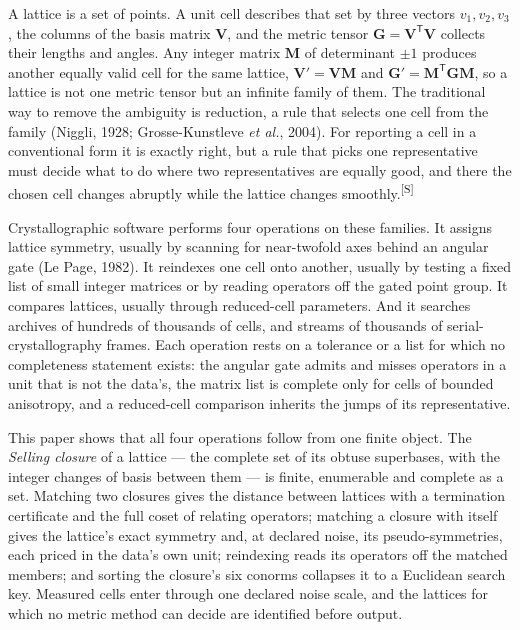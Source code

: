 \documentclass[preprint,pdf]{iucr}          %
\makeatletter
\newcommand{\Gmet}{\mathbf{G}}
\newcommand{\Mop}{\mathbf{M}}
\newcommand{\Bbasis}{\mathbf{V}}
\newcommand{\chk}[1]{\textsuperscript{[S\@nameuse{zn@#1}]}}
\makeatother
\begin{document}
A lattice is a set of points. A unit cell describes that set by three vectors $v_1,v_2,v_3$, the columns of the basis matrix $\Bbasis$, and the metric tensor $\Gmet=\Bbasis^{\mathsf T}\Bbasis$ collects their lengths and angles. Any integer matrix $\Mop$ of determinant $\pm1$ produces another equally valid cell for the same lattice, $\Bbasis'=\Bbasis\Mop$ and $\Gmet'=\Mop^{\mathsf T}\Gmet\Mop$, so a lattice is not one metric tensor but an infinite family of them. The traditional way to remove the ambiguity is reduction, a rule that selects one cell from the family (Niggli, 1928; Grosse-Kunstleve \emph{et al.}, 2004). For reporting a cell in a conventional form it is exactly right, but a rule that picks one representative must decide what to do where two representatives are equally good, and there the chosen cell changes abruptly while the lattice changes smoothly.\chk{z:trajectory}

Crystallographic software performs four operations on these families. It assigns lattice symmetry, usually by scanning for near-twofold axes behind an angular gate (Le Page, 1982). It reindexes one cell onto another, usually by testing a fixed list of small integer matrices or by reading operators off the gated point group. It compares lattices, usually through reduced-cell parameters. And it searches archives of hundreds of thousands of cells, and streams of thousands of serial-crystallography frames. Each operation rests on a tolerance or a list for which no completeness statement exists: the angular gate admits and misses operators in a unit that is not the data's, the matrix list is complete only for cells of bounded anisotropy, and a reduced-cell comparison inherits the jumps of its representative.

This paper shows that all four operations follow from one finite object. The \emph{Selling closure} of a lattice --- the complete set of its obtuse superbases, with the integer changes of basis between them --- is finite, enumerable and complete as a set. Matching two closures gives the distance between lattices with a termination certificate and the full coset of relating operators; matching a closure with itself gives the lattice's exact symmetry and, at declared noise, its pseudo-symmetries, each priced in the data's own unit; reindexing reads its operators off the matched members; and sorting the closure's six conorms collapses it to a Euclidean search key. Measured cells enter through one declared noise scale, and the lattices for which no metric method can decide are identified before output.
\end{document}
